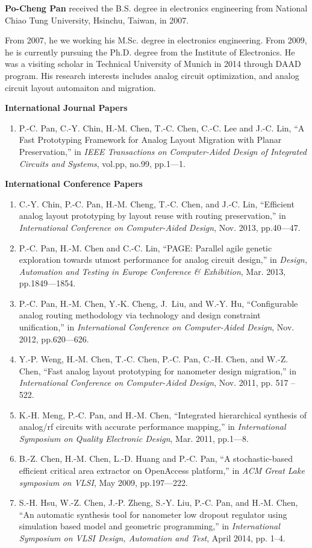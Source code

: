 
{\bf Po-Cheng Pan} received the B.S. degree in electronics engineering from National Chiao Tung University, Hsinchu, Taiwan, in 2007. 

From 2007, he we working his M.Sc. degree in electronics engineering. From 2009, he is currently pursuing the Ph.D. degree from the Institute of Electronics. He was a visiting scholar in Technical University of Munich in 2014 through DAAD program. His research interests includes analog circuit optimization, and analog circuit layout automaiton and migration. 

{\bf International Journal Papers}
\begin{enumerate}
  \item P.-C. Pan, C.-Y. Chin, H.-M. Chen, T.-C. Chen, C.-C. Lee and J.-C. Lin, ``A Fast Prototyping Framework for Analog Layout Migration with Planar Preservation,'' in \emph{IEEE Transactions on Computer-Aided Design of Integrated Circuits and Systems}, vol.pp, no.99, pp.1---1. 
\end{enumerate}
{\bf International Conference Papers}
\begin{enumerate}
  \item C.-Y. Chin, P.-C. Pan, H.-M. Cheng, T.-C. Chen, and J.-C. Lin, ``Efficient analog layout prototyping by layout reuse with routing preservation,'' in \emph{International Conference on Computer-Aided Design}, Nov. 2013, pp.40---47.
  \item P.-C. Pan, H.-M. Chen and C.-C. Lin, ``PAGE: Parallel agile genetic exploration towards utmost performance for analog circuit design,'' in \emph{Design, Automation and Testing in Europe Conference \& Exhibition}, Mar. 2013, pp.1849---1854.
  \item P.-C. Pan, H.-M. Chen, Y.-K. Cheng, J.~Liu, and W.-Y. Hu, ``Configurable analog routing methodology via technology and design constraint unification,'' in \emph{International Conference on Computer-Aided Design}, Nov. 2012, pp.620---626.
  \item Y.-P. Weng, H.-M. Chen, T.-C. Chen, P.-C. Pan, C.-H. Chen, and W.-Z. Chen, ``Fast analog layout prototyping for nanometer design migration,'' in \emph{International Conference on Computer-Aided Design}, Nov. 2011, pp. 517 -- 522.
  \item K.-H. Meng, P.-C. Pan, and H.-M. Chen, ``Integrated hierarchical synthesis of analog/rf circuits with accurate performance mapping,'' in \emph{International Symposium on Quality Electronic Design}, Mar. 2011, pp.1---8. 
  \item B.-Z. Chen, H.-M. Chen, L.-D. Huang and P.-C. Pan, ``A stochastic-based efficient critical area extractor on OpenAccess platform,'' in \emph{ACM Great Lake symposium on VLSI}, May 2009, pp.197---222.
  \item S.-H. Hsu, W.-Z. Chen, J.-P. Zheng, S.-Y. Liu, P.-C. Pan, and H.-M. Chen, ``An automatic synthesis tool for nanometer low dropout regulator using simulation based model and geometric programming,'' in \emph{International Symposium on VLSI Design, Automation and Test}, April 2014, pp. 1--4.
\end{enumerate}
